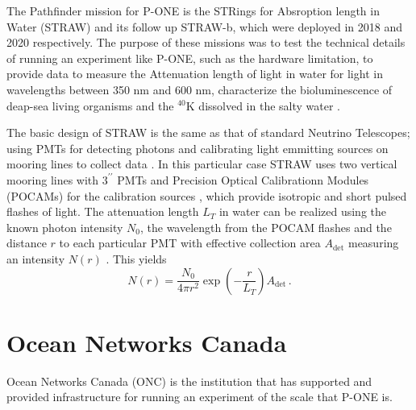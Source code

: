 The Pathfinder mission for P-ONE is the STRings for Absroption length in Water (STRAW) and its follow up STRAW-b, which were deployed in 2018 and 2020 respectively. The purpose of these missions was to test the technical details of running an experiment like P-ONE, such as the hardware limitation, to provide data to measure the Attenuation length of light in water for light in wavelengths between 350 nm and 600 nm, characterize the bioluminescence of deap-sea living organisms and the $^{40}$K dissolved in the salty water \cite{straw}.

The basic design of STRAW is the same as that of standard Neutrino Telescopes; using PMTs for detecting photons and calibrating light emmitting sources on mooring lines to collect data \cite{straw}. In this particular case STRAW uses two vertical mooring lines with $3^{\prime\prime}$ PMTs and Precision Optical Calibrationn Modules (POCAMs) for the calibration sources \cite{straw}, which provide isotropic and short pulsed flashes of light. The attenuation length $L_{T}$ in water can be realized using the known photon intensity $N_{0}$, the wavelength from the POCAM flashes and the distance $r$ to each particular PMT with effective collection area $A_{\text{det}}$ measuring an intensity $N(r)$ \cite{straw}. This yields
\begin{equation}
  N(r) = \frac{N_{0}}{4\pi r^{2}}\exp\left(-\frac{r}{L_{T}}\right)A_{\text{det}}\, .
\end{equation}



\section{Ocean Networks Canada}

Ocean Networks Canada (ONC) is the institution that has supported and provided infrastructure for running an experiment of the scale that P-ONE is. 


